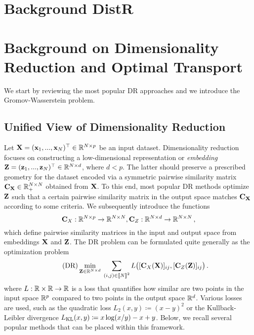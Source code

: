 \section{Background DistR}






\section{Background on Dimensionality Reduction and Optimal Transport}

We start by reviewing the most popular DR approaches and we introduce the Gromov-Wasserstein problem.

\subsection{Unified View of Dimensionality Reduction \label{sec:dr_methods}}

Let ${\mathbf{X}} = ({\mathbf{x}}_1, ..., {\mathbf{x}}_N) ^\top \in \mathbb{R}^{N \times p}$ be an input dataset. Dimensionality reduction focuses on constructing a low-dimensional representation or \emph{embedding} ${\mathbf{Z}} = ({\mathbf{z}}_1, ..., {\mathbf{z}}_N)^\top \in \mathbb{R}^{N \times d}$, where $d< p$. The latter should preserve a prescribed geometry for the dataset encoded via a symmetric pairwise similarity matrix ${\mathbf{C}}_{{\mathbf{X}}} \in \mathbb{R}_+^{N \times N}$ obtained from ${\mathbf{X}}$.
To this end, most popular DR methods optimize ${\mathbf{Z}}$ such that a certain pairwise similarity matrix in the output space matches ${\mathbf{C}}_{{\mathbf{X}}}$ according to some criteria. We subsequently introduce the functions
\begin{equation}
\label{eq:sim_function}
{\mathbf{C}}_{X}: \mathbb{R}^{N \times p} \to \mathbb{R}^{N \times N}, {\mathbf{C}}_{Z}: \mathbb{R}^{N \times d} \to \mathbb{R}^{N \times N}\,,
\end{equation}
which define pairwise similarity matrices in the input and output space from embeddings ${\mathbf{X}}$ and ${\mathbf{Z}}$.
 The DR problem can be formulated quite generally as the optimization problem
\begin{equation}
\label{eq:DR_criterion}\tag{DR}
\min_{\mZ \in \R^{N \times d}} \: \sum_{(i,j) \in \integ{N}^2}  L\big([\simiX(\mX)]_{ij}, [\simi(\mZ)]_{ij}\big) \,. %
\end{equation}
where $L:\mathbb{R} \times \mathbb{R} \rightarrow \mathbb{R}$ is a loss that quantifies how similar are two points in the input space $\mathbb{R}^{p}$ compared to two points in the output space $\mathbb{R}^{d}$. Various losses are used, such as the quadratic loss $L_2(x,y) \coloneqq (x - y)^2$
or the Kullback-Leibler divergence $L_{\operatorname{KL}}(x,y) \coloneqq x \log (x/y) - x +y$.
Below, we recall several popular methods that can be placed within this framework.


